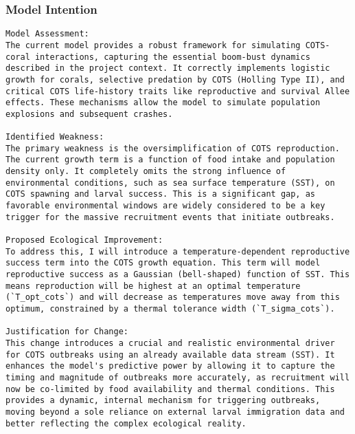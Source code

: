 \subsubsection{Model Intention}
\begin{lstlisting}
Model Assessment:
The current model provides a robust framework for simulating COTS-coral interactions, capturing the essential boom-bust dynamics described in the project context. It correctly implements logistic growth for corals, selective predation by COTS (Holling Type II), and critical COTS life-history traits like reproductive and survival Allee effects. These mechanisms allow the model to simulate population explosions and subsequent crashes.

Identified Weakness:
The primary weakness is the oversimplification of COTS reproduction. The current growth term is a function of food intake and population density only. It completely omits the strong influence of environmental conditions, such as sea surface temperature (SST), on COTS spawning and larval success. This is a significant gap, as favorable environmental windows are widely considered to be a key trigger for the massive recruitment events that initiate outbreaks.

Proposed Ecological Improvement:
To address this, I will introduce a temperature-dependent reproductive success term into the COTS growth equation. This term will model reproductive success as a Gaussian (bell-shaped) function of SST. This means reproduction will be highest at an optimal temperature (`T_opt_cots`) and will decrease as temperatures move away from this optimum, constrained by a thermal tolerance width (`T_sigma_cots`).

Justification for Change:
This change introduces a crucial and realistic environmental driver for COTS outbreaks using an already available data stream (SST). It enhances the model's predictive power by allowing it to capture the timing and magnitude of outbreaks more accurately, as recruitment will now be co-limited by food availability and thermal conditions. This provides a dynamic, internal mechanism for triggering outbreaks, moving beyond a sole reliance on external larval immigration data and better reflecting the complex ecological reality.
\end{lstlisting}

